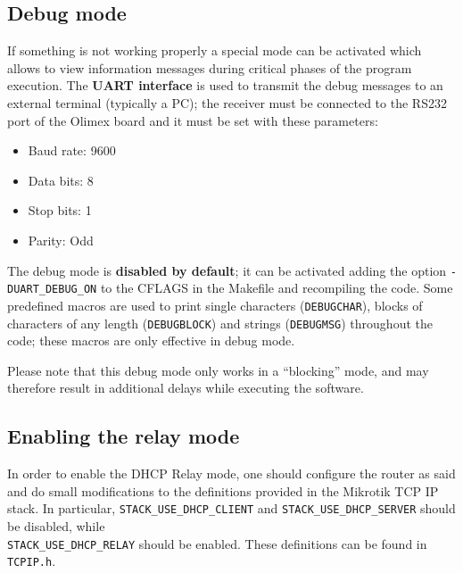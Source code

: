 
\subsection{Debug mode}
If something is not working properly a special mode can be activated which allows to view information messages during critical phases of the program execution. The \textbf{UART interface} is used to transmit the debug messages to an external terminal (typically a PC); the receiver must be connected to the RS232 port of the Olimex board and it must be set with these parameters:
\begin{itemize}
	\item Baud rate: 9600
	\item Data bits: 8
	\item Stop bits: 1
	\item Parity: Odd
\end{itemize}
The debug mode is \textbf{disabled by default}; it can be activated adding the option \texttt{-DUART\_DEBUG\_ON} to the CFLAGS in the Makefile and recompiling the code. Some predefined macros are used to print single characters (\texttt{DEBUGCHAR}), blocks of characters of any length (\texttt{DEBUGBLOCK}) and strings (\texttt{DEBUGMSG}) throughout the code; these macros are only effective in debug mode.

Please note that this debug mode only works in a ``blocking'' mode, and may therefore result in additional delays while executing the software.

\subsection{Enabling the relay mode}
In order to enable the DHCP Relay mode, one should configure the router as said and do small modifications to the definitions provided in the Mikrotik TCP IP stack. In particular, \texttt{STACK\_USE\_DHCP\_CLIENT} and \texttt{STACK\_USE\_DHCP\_SERVER} should be disabled, while \\\texttt{STACK\_USE\_DHCP\_RELAY} should be enabled. These definitions can be found in \texttt{TCPIP.h}.